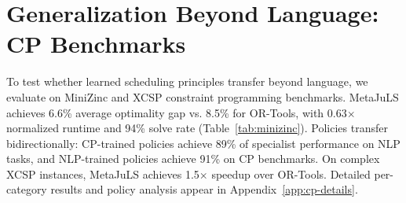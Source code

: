 \documentclass[11pt]{article}
\begin{document}
\begin{table}[t]
  \centering
  \caption{Few-step adaptation results. Meta-learned policies adapt to new tasks in 5--10 gradient steps (5--15 seconds), reaching 85--94\% of specialist performance.}
  \label{tab:zero-shot}
\end{table}




\section{Generalization Beyond Language: CP Benchmarks}
\label{sec:generalization}

To test whether learned scheduling principles transfer beyond language, we evaluate on MiniZinc and XCSP constraint programming benchmarks. MetaJuLS achieves 6.6\% average optimality gap vs. 8.5\% for OR-Tools, with 0.63$\times$ normalized runtime and 94\% solve rate (Table~\ref{tab:minizinc}). Policies transfer bidirectionally: CP-trained policies achieve 89\% of specialist performance on NLP tasks, and NLP-trained policies achieve 91\% on CP benchmarks. On complex XCSP instances, MetaJuLS achieves 1.5$\times$ speedup over OR-Tools. Detailed per-category results and policy analysis appear in Appendix~\ref{app:cp-details}.

\begin{table}[t]
  \centering
  \caption{Generalization beyond language on MiniZinc Challenge benchmarks (2022--2024). Time limit: 1200s per instance. Results averaged over 10 runs.}
  \label{tab:minizinc}
\end{table}
\end{document}
